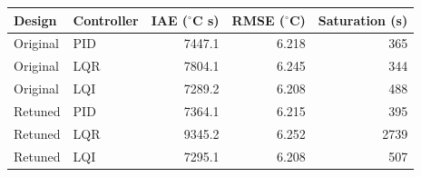 \begin{tabular}{llrrr}\toprule
Design & Controller & IAE ($^\circ$C s) & RMSE ($^\circ$C) & Saturation (s) \\
\midrule
Original & PID & 7447.1 & 6.218 & 365 \\
Original & LQR & 7804.1 & 6.245 & 344 \\
Original & LQI & 7289.2 & 6.208 & 488 \\
Retuned & PID & 7364.1 & 6.215 & 395 \\
Retuned & LQR & 9345.2 & 6.252 & 2739 \\
Retuned & LQI & 7295.1 & 6.208 & 507 \\
\bottomrule\end{tabular}
